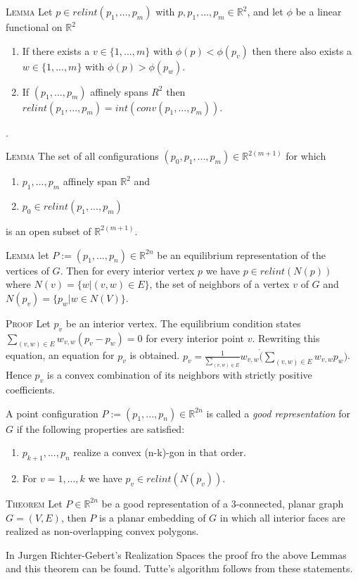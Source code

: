 \documentclass[11pt]{article}
\newcommand{\R}{\mathbb{R}}
\begin{document}
\textsc{Lemma} Let $p \in relint(p_1,...,p_m)$ with $p, p_1,...,p_m \in \R^2$, and let $\phi$ be a linear functional on $\R^2$
	\begin{enumerate}
		\item If there exists a $v \in \{1,...,m\}$ with $\phi(p) < \phi(p_v)$ then there also exists a $w \in \{1,...,m\}$ with $\phi(p) > \phi(p_w)$.
		\item If $(p_1,...,p_m)$ affinely spans $R^2$ then $relint(p_1,...,p_m) = int(conv(p_1,...,p_m))$.
	\end{enumerate} .

\textsc{Lemma} The set of all configurations $(p_0, p_1,...,p_m) \in \R^{2(m+1)}$ for which 
	\begin{enumerate}
		\item $p_1,...,p_m$ affinely span $\R^2$ and
		\item $p_0 \in relint(p_1,...,p_m)$
	\end{enumerate}
	is an open subset of $\R^{2(m+1)}$.

\textsc{Lemma} let $P:=(p_1,...,p_n) \in \R^{2n}$ be an equilibrium representation of the vertices of $G$. Then for every interior vertex $p$ we have $p \in relint(N(p))$ where $N(v) = \{w | (v,w) \in E\}$, the set of neighbors of a vertex $v$ of $G$ and $N(p_v) = \{p_w | w \in N(V)\}$.

\textsc{Proof} Let $p_v$ be an interior vertex. The equilibrium condition states $\sum_{(v,w) \in E} w_{v,w}(p_v - p_w) = 0$ for every interior point $v$. Rewriting this equation, an equation for $p_v$ is obtained. $p_v = \frac{1}{\sum_{(v,w)\in E}}w_{v,w} \dot (\sum_{(v,w) \in E} w_{v,w}p_w)$. Hence $p_v$ is a convex combination of its neighbors with strictly positive coefficients. 

A point configuration $P:=(p_1,...,p_n) \in \R^{2n}$ is called a \emph{good representation} for $G$ if the following properties are satisfied:
	\begin{enumerate}
		\item $p_{k+1},...,p_n$ realize a convex (n-k)-gon in that order.
		\item For $v=1,...,k$ we have $p_v \in relint(N(p_v))$.
	\end{enumerate}
	
\textsc{Theorem} Let $P \in \R^{2n}$ be a good representation of a 3-connected, planar graph $G = (V,E)$, then $P$ is a planar embedding of $G$ in which all interior faces are realized as non-overlapping convex polygons.

In Jurgen Richter-Gebert's Realization Spaces \cite{realizationSpaces} the proof fro the above Lemmas and this theorem can be found. Tutte's algorithm follows from these statements.
\end{document}
